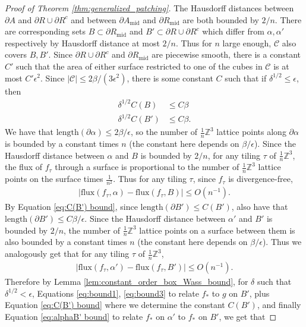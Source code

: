 \documentclass[11pt]{article}
\theoremstyle{remark}
\theoremstyle{definition}
\newcommand{\mc}[1]{\mathcal{#1}}
\newcommand{\m}[1]{\mathbb{#1}}
\begin{document}
\begin{proof}[Proof of Theorem \ref{thm:generalized_patching}]
The Hausdorff distances between $\partial A$ and $\partial R\cup \partial R^c$ and between $\partial A_{\text{mid}}$ and $\partial R_{\text{mid}}$ are both bounded by $2/n$. There are corresponding sets $B\subset \partial R_{\text{mid}}$ and $B'\subset \partial R\cup \partial R^c$ which differ from $\alpha, \alpha'$ respectively by Hausdorff distance at most $2/n$. Thus for $n$ large enough, $\mc C$ also covers $B,B'$. Since $\partial R\cup \partial R^c$ and $\partial R_{\text{mid}}$ are piecewise smooth, there is a constant $C'$ such that the area of either surface restricted to one of the cubes in $\mc C$ is at most $C' \epsilon^2$. Since $|\mc C| \leq 2\beta/(3\epsilon^2)$, there is some constant $C$ such that if $\delta^{1/2}\leq\epsilon$, then
\begin{align}
    \label{eq:C(B) bound}\delta^{1/2} C(B) &\leq C \beta\\
    \label{eq:C(B') bound}\delta^{1/2}C(B') &\leq C \beta.
\end{align}
We have that $\text{length}(\partial \alpha)\leq 2\beta/\epsilon$, so the number of $\frac{1}{n} \m Z^3$ lattice points along $\partial \alpha$ is bounded by a constant times $n$ (the constant here depends on $\beta/\epsilon$). Since the Hausdorff distance between $\alpha$ and $B$ is bounded by $2/n$, for any tiling $\tau$ of $\frac{1}{n} \m Z^3$, the flux of $f_\tau$ through a surface is proportional to the number of $\frac{1}{n}\m Z^3$ lattice points on the surface times $\frac{1}{n^2}$. Thus for any tiling $\tau$, since $f_\tau$ is divergence-free,
\begin{align}\label{eq:alphaB bound}
    |\text{flux}(f_\tau,\alpha) - \text{flux}(f_\tau,B)| \leq O(n^{-1}).
\end{align}
By Equation \eqref{eq:C(B') bound}, since $\text{length}(\partial B')\leq C(B')$, also have that $\text{length}(\partial B')\leq C \beta/\epsilon$. Since the Hausdorff distance between $\alpha'$ and $B'$ is bounded by $2/n$, the number of $\frac{1}{n}\m Z^3$ lattice points on a surface between them is also bounded by a constant times $n$ (the constant here depends on $\beta/\epsilon$). Thus we analogously get that for any tiling $\tau$ of $\frac{1}{n} \m Z^3$,
\begin{align}\label{eq:alphaB' bound}
    |\text{flux}(f_\tau,\alpha') - \text{flux}(f_\tau,B')| \leq O(n^{-1}).
\end{align}
Therefore by Lemma \ref{lem:constant_order_box_Wass_bound}, for $\delta$ such that $\delta^{1/2}<\epsilon$, Equations \eqref{eq:bound1},   \eqref{eq:bound3} to relate $f_*$ to $g$ on $B'$, plus Equation  \eqref{eq:C(B') bound} where we determine the constant $C(B')$, and finally Equation \eqref{eq:alphaB' bound} to relate $f_*$ on $\alpha'$ to $f_*$ on $B'$, we get that

\end{proof}
\end{document}
